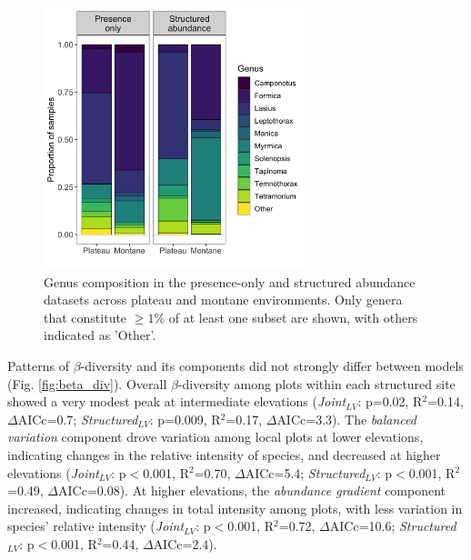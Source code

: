 \documentclass[preprint,review,times,12pt]{elsarticle}
\begin{document}
\begin{figure}
	\centering\includegraphics[width=3in]{ms/1_Ecography/1/figs/genus_assemblages.png}
	\caption{\label{fig:genus_assemblages} Genus composition in the presence-only and structured abundance datasets across plateau and montane environments. Only genera that constitute $\geq 1\%$ of at least one subset are shown, with others indicated as 'Other'.}
\end{figure}

Patterns of $\beta$-diversity and its components did not strongly differ between models (Fig. \ref{fig:beta_div}). Overall $\beta$-diversity among plots within each structured site showed a very modest peak at intermediate elevations (\emph{Joint}$_{LV}$: p=0.02, R$^2$=0.14, $\Delta$AICc=0.7; \emph{Structured}$_{LV}$: p=0.009, R$^2$=0.17, $\Delta$AICc=3.3). The \emph{balanced variation} component drove variation among local plots at lower elevations, indicating changes in the relative intensity of species, and decreased at higher elevations (\emph{Joint}$_{LV}$: p$<$0.001, R$^2$=0.70, $\Delta$AICc=5.4; \emph{Structured}$_{LV}$: p$<$0.001, R$^2$=0.49, $\Delta$AICc=0.08). At higher elevations, the \emph{abundance gradient} component increased, indicating changes in total intensity among plots, with less variation in species' relative intensity (\emph{Joint}$_{LV}$: p$<$0.001, R$^2$=0.72, $\Delta$AICc=10.6; \emph{Structured}$_{LV}$: p$<$0.001, R$^2$=0.44, $\Delta$AICc=2.4). 
\end{document}

